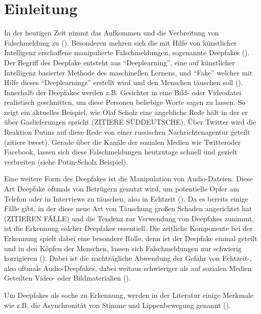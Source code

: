 \section{Einleitung}
In der heutigen Zeit nimmt das Aufkommen und die Verbreitung von Falschmeldung zu (\cite{Hancock2021}).
Besonderen mehren sich die mit Hilfe von künstlicher Intelligenz erschaffene manipulierte Falschmeldungen, sogenannte Deepfakes (\cite{Shahzad2022}).
Der Begriff des Deepfake entsteht aus ``Deeplearning'', eine auf künstlicher Intelligenz basierter Methode des maschinellen Lernens, und ``Fake'' welcher mit Hilfe dieses ``Deeplearnings'' erstellt wird und den Menschen täuschen soll (\cite{Mueller2022}).
Innerhalb der Deepfakes werden z.B. Gesichter in eine Bild- oder Videodatei realistisch geschnitten, um diese Personen beliebige Worte sagen zu lassen.
So zeigt ein aktuelles Beispiel, wie Olaf Scholz eine angebliche Rede hält in der er über Gaslieferungen spricht (ZITIERE SÜDDEUTSCHE).
Über Twitter wird die Reaktion Putins auf diese Rede von einer russischen Nachrichtenagentur geteilt (zitiere tweet).
Gerade über die Kanäle der sozialen Medien wie Twitteroder Facebook, lassen sich diese Falschmeldungen heutzutage schnell und gezielt verbreiten (siehe Putin-Scholz Beispiel).
\par
Eine weitere Form des Deepfakes ist die Manipulation von Audio-Dateien.
Diese Art Deepfake oftmals von Betrügern genutzt wird, um potentielle Opfer am Telefon oder in Interviews zu täuschen, also in Echtzeit (\cite{Mueller2022}).
Da es bereits einige Fälle gibt, in der diese neue Art von Täuschung großen Schaden angerichtet hat (ZITIEREN FÄLLE) und die Tendenz zur Verwendung von Deepfakes zunimmt, ist die Erkennung solcher Deepfakes essentiell.
Die zeitliche Komponente bei der Erkennung spielt dabei eine besondere Rolle, denn ist der Deepfake einmal geteilt und in den Köpfen der Menschen, lassen sich Falschmeldungen nur schwierig korrigieren (\cite{Hancock2021}).
Dabei ist die nachträgliche Abwendung der Gefahr von Echtzeit-, also oftmals Audio-Deepfakes, dabei weitaus schwieriger als auf sozialen Medien Geteilten Video- oder Bildmaterialien (\cite{Shahzad2022}).
\par
Um Deepfakes als soche zu Erkennung, werden in der Literatur einige Merkmale wie z.B. die Asynchronität von Stimme und Lippenbewegung genannt (\cite{Appel2022}).
